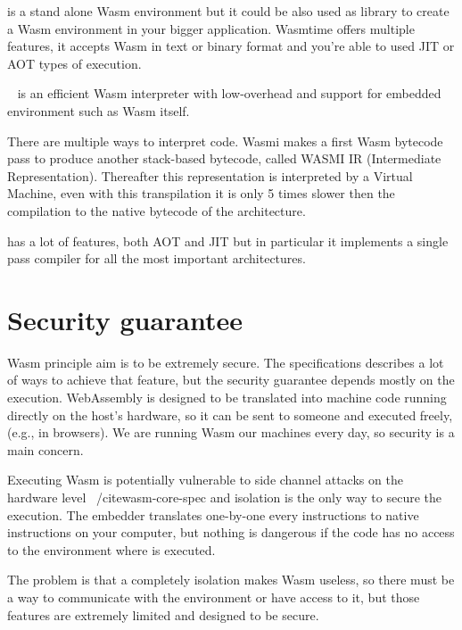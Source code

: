 \begin{description}[font=$\bullet$ \scshape\bfseries]
  \item[Wasmtime]
        is a stand alone Wasm environment but it could be also used as library to create a Wasm environment in your bigger application. Wasmtime offers multiple features, it accepts Wasm in text or binary format and you're able to used JIT or AOT types of execution.
  \item[Wasmi]
        ~\cite{wasmi} is an efficient Wasm interpreter with low-overhead and support for embedded environment such as Wasm itself.

        There are multiple ways to interpret code. Wasmi makes a first Wasm bytecode pass to produce another stack-based bytecode, called WASMI IR (Intermediate Representation). Thereafter this representation is interpreted by a Virtual Machine, even with this transpilation it is only 5 times slower then the compilation to the native bytecode of the architecture.

        \item[Wasmer] has a lot of features, both AOT and JIT but in particular it implements a single pass compiler for all the most important architectures.
\end{description}

\section{Security guarantee}

Wasm principle aim is to be extremely secure. The specifications describes a lot of ways to achieve that feature, but the security guarantee depends mostly on the execution. WebAssembly is designed to be translated into machine code running directly on the host’s hardware, so it can be sent to someone and executed freely, (e.g., in browsers). We are running Wasm our machines every day, so security is a main concern.

Executing Wasm is potentially vulnerable to side channel attacks on the hardware level ~/cite{wasm-core-spec} and isolation is the only way to secure the execution.  The embedder translates one-by-one every instructions to native instructions on your computer, but nothing is dangerous if the code has no access to the environment where is executed.

The problem is that a completely isolation makes Wasm useless, so there must be a way to communicate with the environment or  have access to it, but those features are extremely limited and designed to be secure.

